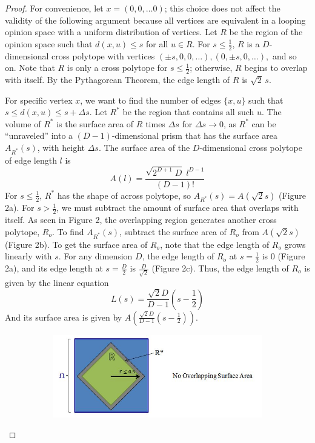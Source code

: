\documentclass[a4paper,10pt]{article}
\begin{document}
\begin{proof}
For convenience, let $x = (0, 0, \ldots 0)$; this choice does not affect the validity of the following argument because all vertices are equivalent in a looping opinion space with a uniform distribution of vertices. Let $R$ be the region of the opinion space such that $d(x, u) \leq s$ for all $u \in R$. For $s \leq \frac{1}{2}$, $R$ is a $D$-dimensional cross polytope with vertices $(\pm s, 0, 0, \ldots), (0, \pm s, 0, \ldots),$ and so on. Note that $R$ is only a cross polytope for $s \leq \frac{1}{2}$; otherwise, $R$ begins to overlap with itself. By the Pythagorean Theorem, the edge length of $R$ is $\sqrt{2}\,s$.

For specific vertex $x$, we want to find the number of edges $\{x, u\}$ such that $s \leq d(x, u) \leq s + \Delta s.$ Let $R^*$ be the region that contains all such $u$.  The volume of $R^*$ is the surface area of $R$ times $\Delta s$ for $\Delta s \to 0$, as $R^*$ can be ``unraveled'' into a $(D-1)$-dimensional prism that has the surface area $A_{R^*}(s)$, with height $\Delta s$. The surface area of the $D$-dimensional cross polytope of edge length $l$ is
\begin{equation}
A(l) = \frac{\sqrt{2^{D+1}\;D} \; l^{D-1}}{(D-1)!}
\end{equation} 
For $s \leq \frac{1}{2}$, $R^*$ has the shape of across polytope, so $A_{R^*}(s) = A(\sqrt{2}s)$ (Figure 2a). For $s > \frac{1}{2}$, we must subtract the amount of surface area that overlaps with itself. As seen in Figure 2, the overlapping region generates another cross polytope, $R_o$. To find $A_{R^*}(s)$, subtract the surface area of $R_o$ from $A(\sqrt{2}s)$ (Figure 2b). To get the surface area of $R_o$, note that the edge length of $R_o$ grows linearly with $s$. For any dimension $D$, the edge length of $R_o$ at $s = \frac{1}{2}$ is $0$ (Figure 2a), and its edge length at $s = \frac{D}{2}$ is $\frac{D}{\sqrt{2}}$ (Figure 2c). Thus, the edge length of $R_o$ is given by the linear equation
\begin{equation}
	L(s) = \frac{\sqrt{2}D}{D-1}\left(s-\frac{1}{2}\right)
\end{equation}
And its surface area is given by $A\left(\frac{\sqrt{2}D}{D-1}\left(s-\frac{1}{2}\right)\right)$.
\begin{figure}
	\begin{subfigure}[b]{1\textwidth}
        \centering
        \includegraphics[scale=.6]{images/overlappingExplanation_1.jpg}

\end{subfigure}
\end{figure}
\end{proof}
\end{document}
